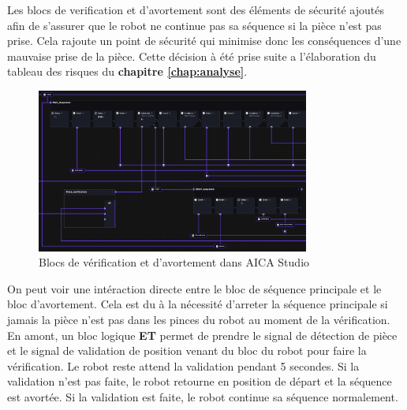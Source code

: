Les blocs de verification et d'avortement sont des éléments de sécurité ajoutés afin de s'assurer que le robot ne continue pas sa séquence si la pièce n'est pas prise. Cela rajoute un point de sécurité qui minimise donc les conséquences d'une mauvaise prise de la pièce.  Cette décision à été prise suite a l'élaboration du tableau des risques du \textbf{chapitre \ref{chap:analyse}}.

\begin{figure}[H]
    \centering
    \includegraphics[width=0.8\textwidth]{assets/figures/AICA_Abort_sequence.png}
    \caption{Blocs de vérification et d'avortement dans AICA Studio}
    \label{fig:verification_block}
\end{figure}

On peut voir une intéraction directe entre le bloc de séquence principale et le bloc d'avortement. Cela est du à la nécessité d'arreter la séquence principale si jamais la pièce n'est pas dans les pinces du robot au moment de la vérification. En amont, un bloc logique \textbf{ET} permet de prendre le signal de détection de pièce et le signal de validation de position venant du bloc du robot pour faire la vérification. Le robot reste attend la validation pendant 5 secondes. Si la validation n'est pas faite, le robot retourne en position de départ et la séquence est avortée. Si la validation est faite, le robot continue sa séquence normalement.

